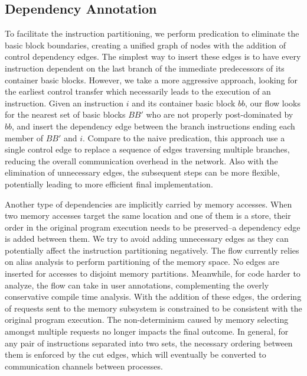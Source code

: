 \documentclass{sig-alternate}
\begin{document}
\subsection{Dependency Annotation}
\label{mainConvert:mem}
To facilitate the instruction partitioning, we perform predication to eliminate the basic block boundaries, creating a unified graph of nodes with the
addition of control dependency edges. 
The simplest way to insert these edges is to have every instruction dependent on the last branch of the immediate
predecessors of its container basic blocks. However, we take a more aggressive approach, looking for the earliest control transfer which necessarily leads to the execution of an instruction.
Given an instruction $i$ and its container basic block $bb$, our
flow looks for the nearest set of basic blocks $BB'$ who are not properly post-dominated by $bb$,
and insert the dependency edge between the branch instructions ending each member of $BB'$ and $i$. Compare to the naive predication, this approach use a single control edge to replace a sequence of edges traversing multiple branches, reducing the overall communication
overhead in the network. Also with the elimination of unnecessary edges, the subsequent steps can be more flexible, potentially leading to more efficient final implementation.

Another type of dependencies are implicitly carried by memory accesses. When
two memory accesses target the same location and one of
them is a store, their order in the original program execution
needs to be preserved--a dependency edge is added
between them. We try to avoid adding unnecessary edges as they
can potentially affect the instruction partitioning negatively. 
The flow currently relies on alias analysis to perform partitioning of the memory space. No edges are inserted for accesses to disjoint memory partitions. 
Meanwhile, for code harder to analyze, the flow can take in user annotations, complementing the overly conservative compile time analysis. With the addition of these edges, the ordering of requests sent to the memory
subsystem is constrained to be consistent with the original program execution.
The non-determinism caused by memory selecting amongst multiple requests no longer
impacts the final outcome. In general, for any pair of instructions separated into two sets, the necessary ordering between them is enforced by the cut edges,
which will eventually be converted to communication channels between processes.
\end{document}
